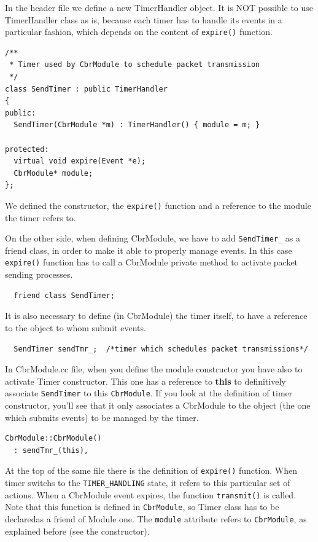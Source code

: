 \documentclass[a4paper,10pt]{article}
\begin{document}
In the header file we define a new TimerHandler object. It is NOT possible to use TimerHandler class as is, because each timer has to handle its events in a particular fashion, which depends on the content of \verb=expire()= function.

\begin{verbatim}
/**
 * Timer used by CbrModule to schedule packet transmission
 */
class SendTimer : public TimerHandler
{
public:
  SendTimer(CbrModule *m) : TimerHandler() { module = m; }
	
protected:
  virtual void expire(Event *e);
  CbrModule* module;
};
\end{verbatim}

We defined the constructor, the \verb=expire()= function and a reference to the module the timer refers to.

On the other side, when defining CbrModule, we have to add \verb=SendTimer_= as a friend class, in order to make it able to properly manage events. In this case \verb=expire()= function has to call a CbrModule private method to activate packet sending processes.

\begin{verbatim}
  friend class SendTimer;
\end{verbatim}

It is also necessary to define (in CbrModule) the timer itself, to have a reference to the object to whom submit events.

\begin{verbatim}
  SendTimer sendTmr_;  /*timer which schedules packet transmissions*/
\end{verbatim}

In CbrModule.cc file, when you define the module constructor you have also to activate Timer constructor. This one has a reference to \textbf{this} to definitively associate \verb=SendTimer= to this \verb=CbrModule=. If you look at the definition of timer constructor, you'll see that it only associates a CbrModule to the object (the one which submits events) to be managed by the timer.

\begin{verbatim}
CbrModule::CbrModule() 
  : sendTmr_(this),
\end{verbatim}

At the top of the same file there is the definition of \verb=expire()= function. When timer switchs to the \verb=TIMER_HANDLING= state, it refers to this particular set of actions. When a CbrModule event expires, the function \verb=transmit()= is called. Note that this function is defined in \verb=CbrModule=, so Timer class has to be declaredas a  friend of Module one. The \verb=module= attribute refers to \verb=CbrModule=, as explained before (see the constructor).
\end{document}
